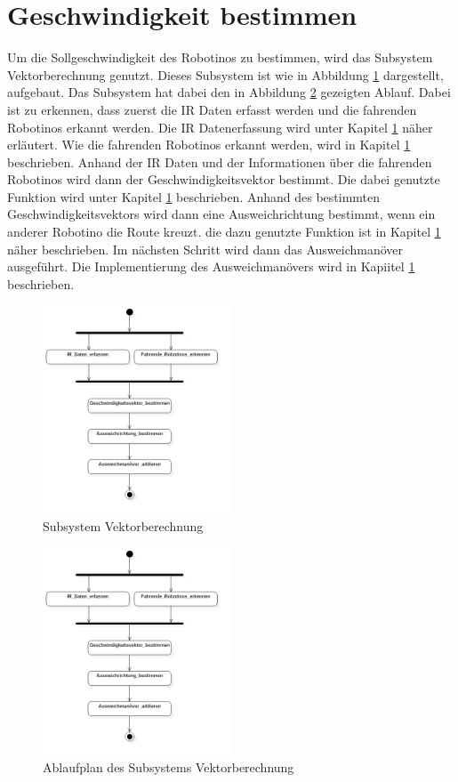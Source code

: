 \section{Geschwindigkeit bestimmen}
Um die Sollgeschwindigkeit des Robotinos zu bestimmen, wird das Subsystem Vektorberechnung genutzt. Dieses Subsystem ist wie in Abbildung \ref{fig:Vektorberechnung} dargestellt, aufgebaut. Das Subsystem hat dabei den in Abbildung \ref{fig:AblVektor} gezeigten Ablauf. Dabei ist zu erkennen, dass zuerst die IR Daten erfasst werden und die fahrenden Robotinos erkannt werden. Die IR Datenerfassung wird unter Kapitel \ref{} näher erläutert. Wie die fahrenden Robotinos erkannt werden, wird in Kapitel \ref{} beschrieben. Anhand der IR Daten und der Informationen über die fahrenden Robotinos wird dann der Geschwindigkeitsvektor bestimmt. Die dabei genutzte Funktion wird unter Kapitel \ref{} beschrieben. Anhand des bestimmten Geschwindigkeitsvektors wird dann eine Ausweichrichtung bestimmt, wenn ein anderer Robotino die Route kreuzt. die dazu genutzte Funktion ist in Kapitel \ref{} näher beschrieben. Im nächsten Schritt wird dann das Ausweichmanöver ausgeführt. Die Implementierung des Ausweichmanövers wird in Kapiitel \ref{} beschrieben.

\begin{figure}
	\centering	\includegraphics[width=0.5\textwidth]{grafiken/Geschwindigkeit_bestimmen.png}
	\caption{Subsystem Vektorberechnung}
	\label{fig:Vektorberechnung}
\end{figure}

\begin{figure}
	\centering	\includegraphics[width=0.5\textwidth]{grafiken/Geschwindigkeit_bestimmen.png}
	\caption{Ablaufplan des Subsystems Vektorberechnung}
	\label{fig:AblVektor}
\end{figure}

